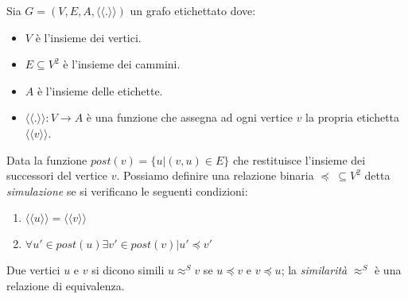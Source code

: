 \begin{definition}
Sia $G = (V, E,A, \langle\langle.\rangle\rangle)$ un grafo etichettato dove: 
\begin{itemize}
\item $V$ è l'insieme dei vertici.
\item $E \subseteq V^2$ è l'insieme dei cammini.
\item $A$ è l'insieme delle etichette.
\item $\langle\langle.\rangle\rangle:V \to A$ è una funzione che assegna ad ogni vertice $v$ la propria etichetta $\langle\langle v\rangle\rangle$.
\end{itemize}
Data la funzione $post(v) = \{u|(v,u) \in E\}$ che restituisce l'insieme dei successori del vertice $v$.
Possiamo definire una relazione binaria $\preceq\;\subseteq V^2$ detta \emph{simulazione} se si verificano le seguenti condizioni:
\begin{enumerate}
\item $\langle\langle u \rangle\rangle = \langle\langle v \rangle\rangle$
\item $\forall u' \in post(u) \exists v' \in post(v) | u' \preceq v'$
\end{enumerate}
\begin{lemma}
Due vertici $u$ e $v$ si dicono simili $u\approx^Sv$ se $u \preceq v$ e $v \preceq u$; la \emph{similarità} $\approx^S$ è una relazione di equivalenza.
\end{lemma}
\end{definition}
